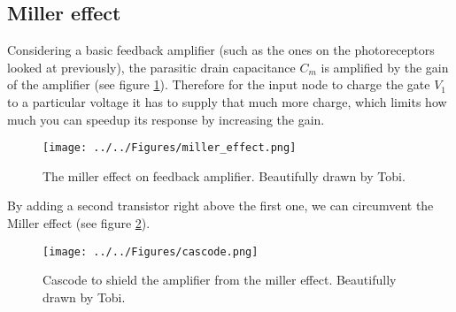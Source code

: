 \subsection{Miller effect}

Considering a basic feedback amplifier (such as the ones on the photoreceptors looked at previously), the parasitic drain capacitance $C_m$ is amplified by the gain of the amplifier (see figure \ref{fig:MillerEffect}). Therefore for the input node to charge the gate $V_1$ to a particular voltage it has to supply that much more charge, which limits how much you can speedup its response by increasing the gain.

\begin{figure}[H]
    \centering
    \texttt{[image: ../../Figures/miller\_effect.png]}
    \caption{The miller effect on feedback amplifier. Beautifully drawn by Tobi.}
    \label{fig:MillerEffect}
\end{figure}

By adding a second transistor right above the first one, we can circumvent the Miller effect (see figure \ref{fig:Cascode}).

\begin{figure}[H]
    \centering
    \texttt{[image: ../../Figures/cascode.png]}
    \caption{Cascode to shield the amplifier from the miller effect. Beautifully drawn by Tobi.}
    \label{fig:Cascode}
\end{figure}
 